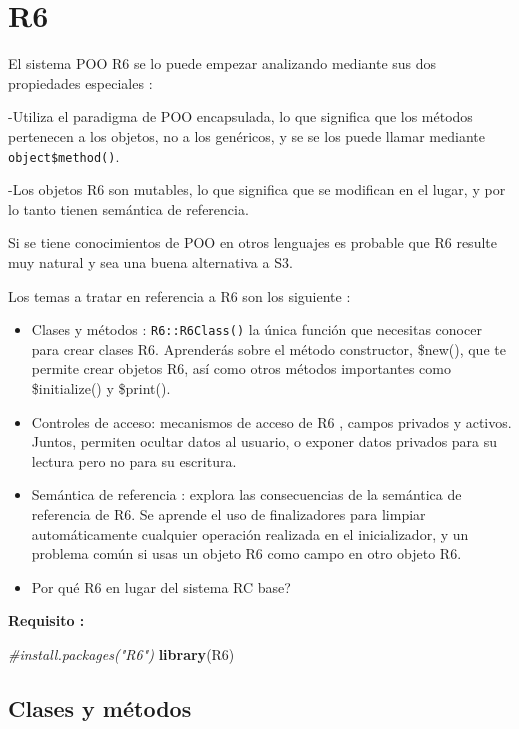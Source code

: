 \documentclass[
]{book}
\newenvironment{Shaded}{\begin{snugshade}}{\end{snugshade}}
\newcommand{\CommentTok}[1]{\textcolor[rgb]{0.56,0.35,0.01}{\textit{#1}}}
\newcommand{\FunctionTok}[1]{\textcolor[rgb]{0.13,0.29,0.53}{\textbf{#1}}}
\newcommand{\NormalTok}[1]{#1}
\begin{document}
\hypertarget{r6}{%
\chapter{R6}\label{r6}}

El sistema POO R6 se lo puede empezar analizando mediante sus dos propiedades especiales :

-Utiliza el paradigma de POO encapsulada, lo que significa que los métodos pertenecen a los objetos, no a los genéricos, y se se los puede llamar mediante \texttt{object\$method()}.

-Los objetos R6 son mutables, lo que significa que se modifican en el lugar, y por lo tanto tienen semántica de referencia.

Si se tiene conocimientos de POO en otros lenguajes es probable que R6 resulte muy natural y sea una buena alternativa a S3.

Los temas a tratar en referencia a R6 son los siguiente :

\begin{itemize}
\item
  Clases y métodos : \texttt{R6::R6Class()} la única función que necesitas conocer para crear clases R6. Aprenderás sobre el método constructor, \$new(), que te permite crear objetos R6, así como otros métodos importantes como \$initialize() y \$print().
\item
  Controles de acceso: mecanismos de acceso de R6 , campos privados y activos. Juntos, permiten ocultar datos al usuario, o exponer datos privados para su lectura pero no para su escritura.
\item
  Semántica de referencia : explora las consecuencias de la semántica de referencia de R6. Se aprende el uso de finalizadores para limpiar automáticamente cualquier operación realizada en el inicializador, y un problema común si usas un objeto R6 como campo en otro objeto R6.
\item
  Por qué R6 en lugar del sistema RC base?
\end{itemize}

\textbf{Requisito : }

\begin{Shaded}
\begin{Highlighting}[]
\CommentTok{\#install.packages("R6")}
\FunctionTok{library}\NormalTok{(R6)}
\end{Highlighting}
\end{Shaded}

\hypertarget{clases-y-muxe9todos}{%
\section{Clases y métodos}\label{clases-y-muxe9todos}}
\end{document}
